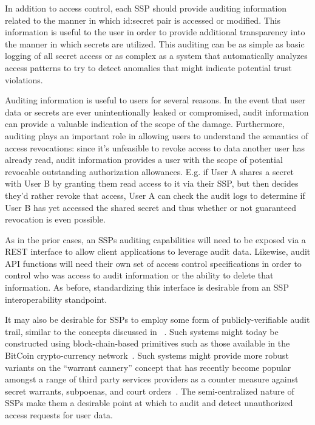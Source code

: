 In addition to access control, each SSP should provide auditing
information related to the manner in which id:secret pair is accessed
or modified. This information is useful to the user in order to
provide additional transparency into the manner in which secrets are
utilized. This auditing can be as simple as basic logging of all
secret access or as complex as a system that automatically analyzes
access patterns to try to detect anomalies that might indicate
potential trust violations.

Auditing information is useful to users for several reasons. In the
event that user data or secrets are ever unintentionally leaked or
compromised, audit information can provide a valuable indication of
the scope of the damage. Furthermore, auditing plays an important role
in allowing users to understand the semantics of access revocations:
since it's unfeasible to revoke access to data another user has
already read, audit information provides a user with the scope of
potential revocable outstanding authorization allowances. E.g. if User
A shares a secret with User B by granting them read access to it via
their SSP, but then decides they'd rather revoke that access, User A
can check the audit logs to determine if User B has yet accessed the
shared secret and thus whether or not guaranteed revocation is even
possible.

As in the prior cases, an SSPs auditing capabilities will need to be
exposed via a REST interface to allow client applications to leverage
audit data. Likewise, audit API functions will need their own set of
access control specifications in order to control who was access to
audit information or the ability to delete that information. As
before, standardizing this interface is desirable from an SSP
interoperability standpoint.

It may also be desirable for SSPs to employ some form of
publicly-verifiable audit trail, similar to the concepts discussed in
~\cite{blaze1996}. Such systems might today be constructed using
block-chain-based primitives such as those available in the BitCoin
crypto-currency network~\cite{Nakamoto2008}. Such systems might
provide more robust variants on the ``warrant cannery'' concept that
has recently become popular amongst a range of third party services
providers as a counter measure against secret warrants, subpoenas, and
court orders~\cite{eff-canary}. The semi-centralized nature of SSPs
make them a desirable point at which to audit and detect unauthorized
access requests for user data.

